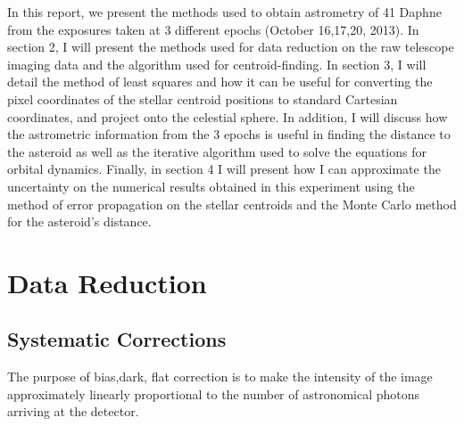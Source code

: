 \documentclass[authoryear, 12pt,5p, times]{elsarticle}
\begin{document}
In this report, we present the methods used to obtain astrometry of 41 Daphne from the exposures taken at 3 different epochs (October 16,17,20, 2013). In section 2, I will present the methods used for data reduction on the raw telescope imaging data and the algorithm used for centroid-finding. In section 3, I will detail the method of least squares and how it can be useful for converting the pixel coordinates of the stellar centroid positions to standard Cartesian coordinates, and project onto the celestial sphere. In addition, I will discuss how the astrometric information from the 3 epochs is useful in finding the distance to the asteroid as well as the iterative algorithm used to solve the equations for orbital dynamics. Finally, in section 4 I will present how I can approximate the uncertainty on the  numerical results obtained in this experiment using the method of error propagation on the stellar centroids and the Monte Carlo method for the asteroid's distance.
\section{Data Reduction}
	\subsection{Systematic  Corrections}
The purpose of bias,dark, flat correction is to make the intensity of the image approximately linearly proportional to the number of astronomical photons arriving at the detector.
\end{document}
